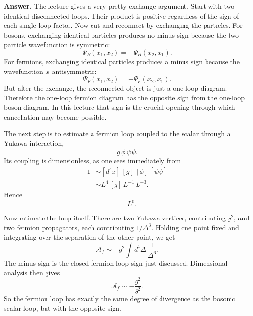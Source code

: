 \textbf{Answer.} The lecture gives a very pretty exchange argument. Start with two identical disconnected loops. Their product is positive regardless of the sign of each single-loop factor. Now cut and reconnect by exchanging the particles. For bosons, exchanging identical particles produces no minus sign because the two-particle wavefunction is symmetric:
\begin{equation}
\Psi_B(x_1,x_2)=+\Psi_B(x_2,x_1).
\end{equation}
For fermions, exchanging identical particles produces a minus sign because the wavefunction is antisymmetric:
\begin{equation}
\Psi_F(x_1,x_2)=-\Psi_F(x_2,x_1).
\end{equation}
But after the exchange, the reconnected object is just a one-loop diagram. Therefore the one-loop fermion diagram has the opposite sign from the one-loop boson diagram. In this lecture that sign is the crucial opening through which cancellation may become possible.

The next step is to estimate a fermion loop coupled to the scalar through a Yukawa interaction,
\begin{equation}
g\,\phi\,\bar\psi\psi.
\end{equation}
Its coupling is dimensionless, as one sees immediately from
\begin{align}
1 &\sim [d^4x]\,[g]\,[\phi]\,[\bar\psi\psi] \\
  &\sim L^4 \,[g]\, L^{-1}\,L^{-3}.
\end{align}
Hence
\begin{equation}
[g]=L^0.
\end{equation}

Now estimate the loop itself. There are two Yukawa vertices, contributing \(g^2\), and two fermion propagators, each contributing \(1/\Delta^3\). Holding one point fixed and integrating over the separation of the other point, we get
\begin{equation}
\mathcal{A}_f \sim -g^2 \int d^4\Delta\, \frac{1}{\Delta^6}.
\end{equation}
The minus sign is the closed-fermion-loop sign just discussed. Dimensional analysis then gives
\begin{equation}
\mathcal{A}_f \sim -\frac{g^2}{\delta^2}.
\end{equation}
So the fermion loop has exactly the same degree of divergence as the bosonic scalar loop, but with the opposite sign.

